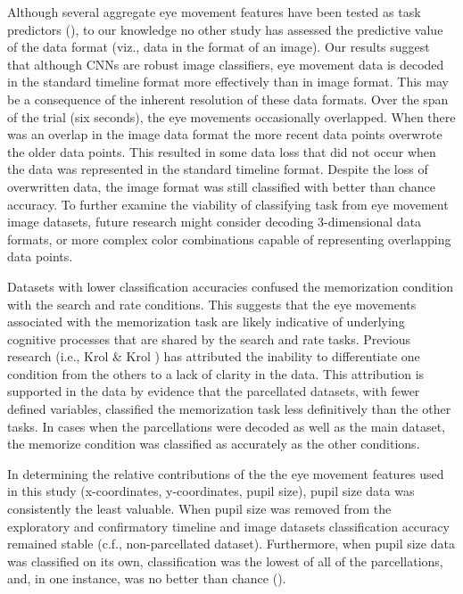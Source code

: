 \documentclass[
  english,
  man]{apa6}
\begin{document}
Although several aggregate eye movement features have been tested as task predictors (), to our knowledge no other study has assessed the predictive value of the data format (viz., data in the format of an image). Our results suggest that although CNNs are robust image classifiers, eye movement data is decoded in the standard timeline format more effectively than in image format. This may be a consequence of the inherent resolution of these data formats. Over the span of the trial (six seconds), the eye movements occasionally overlapped. When there was an overlap in the image data format the more recent data points overwrote the older data points. This resulted in some data loss that did not occur when the data was represented in the standard timeline format. Despite the loss of overwritten data, the image format was still classified with better than chance accuracy. To further examine the viability of classifying task from eye movement image datasets, future research might consider decoding 3-dimensional data formats, or more complex color combinations capable of representing overlapping data points.

Datasets with lower classification accuracies confused the memorization condition with the search and rate conditions. This suggests that the eye movements associated with the memorization task are likely indicative of underlying cognitive processes that are shared by the search and rate tasks. Previous research (i.e., Krol \& Krol ) has attributed the inability to differentiate one condition from the others to a lack of clarity in the data. This attribution is supported in the data by evidence that the parcellated datasets, with fewer defined variables, classified the memorization task less definitively than the other tasks. In cases when the parcellations were decoded as well as the main dataset, the memorize condition was classified as accurately as the other conditions.

In determining the relative contributions of the the eye movement features used in this study (x-coordinates, y-coordinates, pupil size), pupil size data was consistently the least valuable. When pupil size was removed from the exploratory and confirmatory timeline and image datasets classification accuracy remained stable (c.f., non-parcellated dataset). Furthermore, when pupil size data was classified on its own, classification was the lowest of all of the parcellations, and, in one instance, was no better than chance ().
\end{document}
